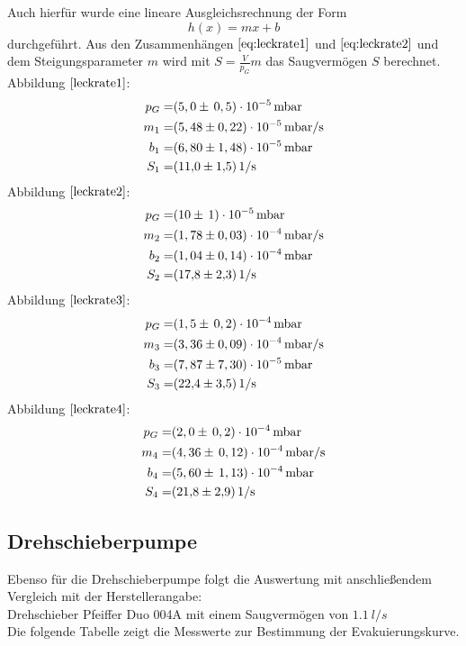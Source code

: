 Auch hierfür wurde eine lineare Ausgleichsrechnung der Form
\begin{equation}
	h(x)=mx+b
\end{equation}
durchgeführt.
Aus den Zusammenhängen $\ref{eq:leckrate1}$ und $\ref{eq:leckrate2}$ und dem Steigungsparameter $m$ wird mit $S=\frac{V}{p_G}m$
das Saugvermögen $S$ berechnet.\\

Abbildung $\ref{leckrate1}$:
	\begin{align*}
		p_G=& (5,0 \pm \, 0,5)\cdot 10^{-5} \, \si{mbar}\\
		m_1=& (5,48 \pm 0,22)\cdot 10^{-5} \, \si{mbar/s}\\
		b_1=& (6,80 \pm 1,48)\cdot 10^{-5} \, \si{mbar}\\
		S_1=& \SI{11,0 \pm 1,5}{1/s}
	\end{align*}
	Abbildung $\ref{leckrate2}$:
		\begin{align*}
			p_G=& (10 \pm \, 1)\cdot 10^{-5} \, \si{mbar}\\
			m_2=& (1,78 \pm 0,03)\cdot 10^{-4} \, \si{mbar/s}\\
			b_2=& (1,04 \pm 0,14)\cdot 10^{-4} \, \si{mbar}\\
			S_2=& \SI{17,8 \pm 2,3}{1/s}
		\end{align*}
		Abbildung $\ref{leckrate3}$:
			\begin{align*}
				p_G=& (1,5 \pm \, 0,2)\cdot 10^{-4} \, \si{mbar}\\
				m_3=& (3,36 \pm 0,09)\cdot 10^{-4} \, \si{mbar/s}\\
				b_3=& (7,87 \pm 7,30)\cdot 10^{-5} \, \si{mbar}\\
				S_3=& \SI{22,4 \pm 3,5}{1/s}
			\end{align*}
		Abbildung $\ref{leckrate4}$:
			\begin{align*}
				p_G=& (2,0 \pm \, 0,2)\cdot 10^{-4} \, \si{mbar}\\
				m_4=& (4,36 \pm \, 0,12)\cdot 10^{-4} \, \si{mbar/s}\\
				b_4=& (5,60 \pm \, 1,13)\cdot 10^{-4} \, \si{mbar}\\
				S_4=& \SI{21,8 \pm 2,9}{1/s}
			\end{align*}

\subsection{Drehschieberpumpe}
Ebenso für die Drehschieberpumpe folgt die Auswertung mit anschließendem Vergleich mit der
Herstellerangabe:\\
Drehschieber Pfeiffer Duo 004A mit einem Saugvermögen von $\SI{1,1}{l/s}$\\
Die folgende Tabelle zeigt die Messwerte zur Bestimmung der Evakuierungskurve.
